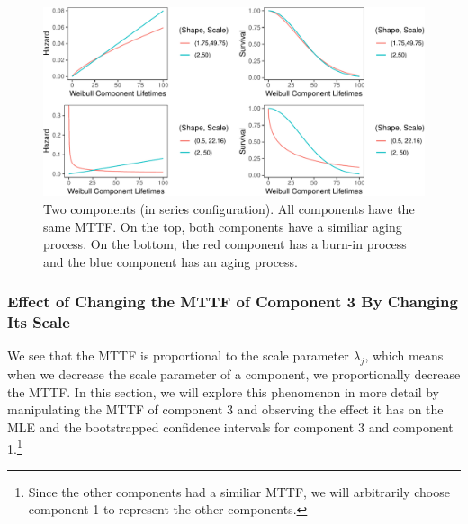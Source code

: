 \documentclass[
]{article}
\begin{document}
\begin{figure}

{\centering \includegraphics{wei_series_md_files/figure-latex/exp_weib_haz-1} 

}

\caption{Two components (in series configuration). All components have the same MTTF. On the top, both components have a similiar aging process. On the bottom, the red component has a burn-in process and the blue component has an aging process.}\label{fig:exp_weib_haz}
\end{figure}

\hypertarget{effect-of-changing-the-mttf-of-component-3-by-changing-its-scale}{%
\subsubsection{Effect of Changing the MTTF of Component 3 By Changing
Its
Scale}\label{effect-of-changing-the-mttf-of-component-3-by-changing-its-scale}}

We see that the MTTF is proportional to the scale parameter
\(\lambda_j\), which means when we decrease the scale parameter of a
component, we proportionally decrease the MTTF. In this section, we will
explore this phenomenon in more detail by manipulating the MTTF of
component 3 and observing the effect it has on the MLE and the
bootstrapped confidence intervals for component 3 and component
1.\footnote{Since the other components had a similiar MTTF, we
will arbitrarily choose component 1 to represent the other components.}
\end{document}
